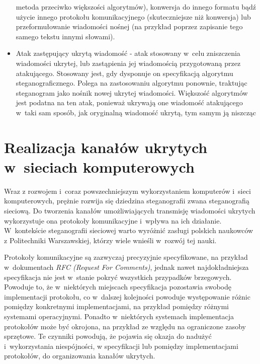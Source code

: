 \documentclass[a4paper, twoside, 12pt]{report}
\begin{document}
\begin{itemize}
                metoda przeciwko większości algorytmów), konwersja do innego formatu
                bądź użycie innego protokołu komunikacyjnego (skuteczniejsze niż konwersja) lub
                przeformułowanie wiadomości nośnej (na przykład poprzez zapisanie tego samego tekstu
                innymi słowami).
            \item Atak zastępujący ukrytą wiadomość - atak stosowany w~celu zniszczenia
                wiadomości ukrytej, lub zastąpienia jej wiadomością przygotowaną przez atakującego.
                Stosowany jest, gdy dysponuje on specyfikacją algorytmu steganograficznego.
                Polega na zastosowaniu algorytmu ponownie, traktując steganogram jako nośnik
                nowej ukrytej wiadomości. Większość algorytmów jest podatna na ten
                atak, ponieważ ukrywają one wiadomość atakującego w~taki sam sposób,
                jak oryginalną wiadomość ukrytą, tym samym ją niszcząc
        \end{itemize}


        \chapter{Realizacja kanałów ukrytych w~sieciach komputerowych} \label{NETWORKSTEGANOGRAPHY}
    Wraz z rozwojem i~coraz powszechniejszym wykorzystaniem komputerów i~sieci
    komputerowych, prężnie rozwija się dziedzina steganografii zwana steganografią
    sieciową. Do tworzenia kanałów umożliwiających transmisję wiadomości ukrytych
    wykorzystuje ona protokoły komunikacyjne i~wpływa na ich działanie. W~kontekście
    steganografii sieciowej warto wyróżnić zasługi polskich naukowców z Politechniki
    Warszawskiej, którzy wiele wnieśli w~rozwój tej nauki\cite{STEGANOGRAFIASIECIOWAART}.

    Protokoły komunikacyjne są zazwyczaj
    precyzyjnie specyfikowane, na przykład w~dokumentach \emph{RFC (Request For Comments)},
    jednak nawet najdokładniejsza
    specyfikacja nie jest w~stanie pokryć wszystkich przypadków brzegowych. Powoduje
    to, że w~niektórych miejscach specyfikacja pozostawia swobodę implementacji protokołu,
    co w~dalszej kolejności powoduje występowanie różnic pomiędzy konkretnymi
    implementacjami, na przykład pomiędzy różnymi systemami operacyjnymi. Ponadto
    w~niektórych systemach implementacja protokołów może być okrojona, na przykład
    ze względu na ograniczone zasoby sprzętowe. Te czynniki
    powodują, że pojawia się okazja do nadużyć i~wykorzystania niespójności, w specyfikacji
    lub pomiędzy implementacjami protokołów, do organizowania
    kanałów ukrytych.
\end{document}
